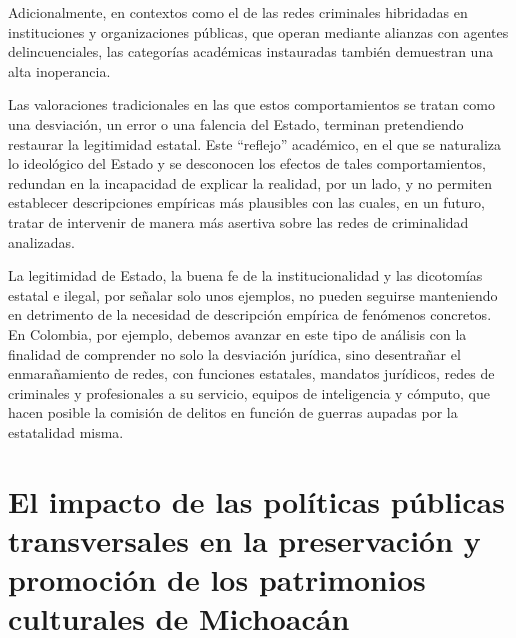 \documentclass[
  spanish,
  11pt,
  a4paper,
]{scrbook}
\begin{document}
Adicionalmente, en contextos como el de las redes criminales hibridadas
en instituciones y organizaciones públicas, que operan mediante alianzas
con agentes delincuenciales, las categorías académicas instauradas
también demuestran una alta inoperancia.

Las valoraciones tradicionales en las que estos comportamientos se
tratan como una desviación, un error o una falencia del Estado, terminan
pretendiendo restaurar la legitimidad estatal. Este ``reflejo''
académico, en el que se naturaliza lo ideológico del Estado y se
desconocen los efectos de tales comportamientos, redundan en la
incapacidad de explicar la realidad, por un lado, y no permiten
establecer descripciones empíricas más plausibles con las cuales, en un
futuro, tratar de intervenir de manera más asertiva sobre las redes de
criminalidad analizadas.

La legitimidad de Estado, la buena fe de la institucionalidad y las
dicotomías estatal e ilegal, por señalar solo unos ejemplos, no pueden
seguirse manteniendo en detrimento de la necesidad de descripción
empírica de fenómenos concretos. En Colombia, por ejemplo, debemos
avanzar en este tipo de análisis con la finalidad de comprender no solo
la desviación jurídica, sino desentrañar el enmarañamiento de redes, con
funciones estatales, mandatos jurídicos, redes de criminales y
profesionales a su servicio, equipos de inteligencia y cómputo, que
hacen posible la comisión de delitos en función de guerras aupadas por
la estatalidad misma.

\printbibliography[heading=subbibliography, title={Referencias Bibliográficas}]


\chapter{El impacto de las políticas públicas transversales en la
preservación y promoción de los patrimonios culturales de
Michoacán}\label{el-impacto-de-las-poluxedticas-puxfablicas-transversales-en-la-preservaciuxf3n-y-promociuxf3n-de-los-patrimonios-culturales-de-michoacuxe1n}

\end{document}
